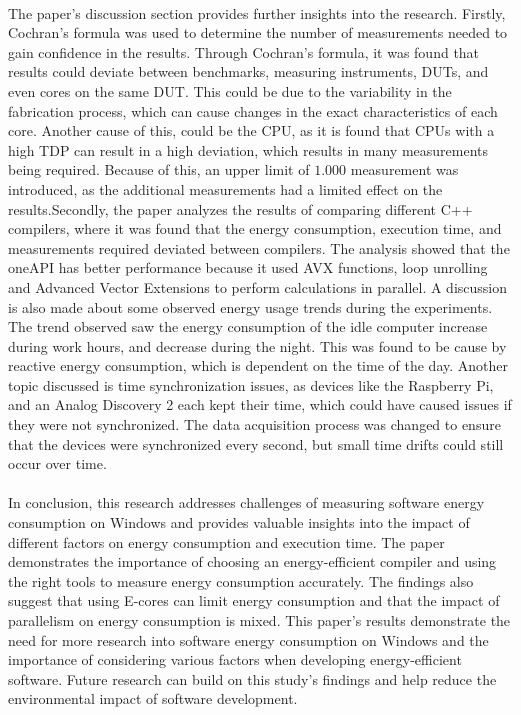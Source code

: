 \paragraph*{}
The paper's discussion section provides further insights into the research. Firstly, Cochran's formula was used to determine the number of measurements needed to gain confidence in the results. Through Cochran's formula, it was found that results could deviate between benchmarks, measuring instruments, DUTs, and even cores on the same DUT. This could be due to the variability in the fabrication process, which can cause changes in the exact characteristics of each core. Another cause of this, could be the CPU, as it is found that CPUs with a high TDP can result in a high deviation, which results in many measurements being required. Because of this, an upper limit of $1.000$ measurement was introduced, as the additional measurements had a limited effect on the results.Secondly, the paper analyzes the results of comparing different C++ compilers, where it was found that the energy consumption, execution time, and measurements required deviated between compilers. The analysis showed that the oneAPI has better performance because it used AVX functions, loop unrolling and Advanced Vector Extensions to perform calculations in parallel. A discussion is also made about some observed energy usage trends during the experiments. The trend observed saw the energy consumption of the idle computer increase during work hours, and decrease during the night. This was found to be cause by reactive energy consumption, which is dependent on the time of the day. Another topic discussed is time synchronization issues, as devices like the Raspberry Pi, and an Analog Discovery 2 each kept their time, which could have caused issues if they were not synchronized. The data acquisition process was changed to ensure that the devices were synchronized every second, but small time drifts could still occur over time.

\paragraph*{}
In conclusion, this research addresses challenges of measuring software energy consumption on Windows and provides valuable insights into the impact of different factors on energy consumption and execution time. The paper demonstrates the importance of choosing an energy-efficient compiler and using the right tools to measure energy consumption accurately. The findings also suggest that using E-cores can limit energy consumption and that the impact of parallelism on energy consumption is mixed. This paper's results demonstrate the need for more research into software energy consumption on Windows and the importance of considering various factors when developing energy-efficient software. Future research can build on this study's findings and help reduce the environmental impact of software development. 

